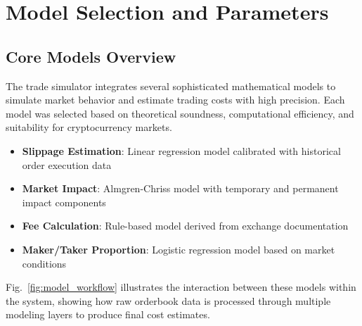 \documentclass[10pt,twocolumn,a4paper]{IEEEtran}
\begin{document}
\section{Model Selection and Parameters}

\subsection{Core Models Overview}

The trade simulator integrates several sophisticated mathematical models to simulate market behavior and estimate trading costs with high precision. Each model was selected based on theoretical soundness, computational efficiency, and suitability for cryptocurrency markets.

\begin{itemize}
    \item \textbf{Slippage Estimation}: Linear regression model calibrated with historical order execution data
    \item \textbf{Market Impact}: Almgren-Chriss model with temporary and permanent impact components
    \item \textbf{Fee Calculation}: Rule-based model derived from exchange documentation
    \item \textbf{Maker/Taker Proportion}: Logistic regression model based on market conditions
\end{itemize}

Fig.~\ref{fig:model_workflow} illustrates the interaction between these models within the system, showing how raw orderbook data is processed through multiple modeling layers to produce final cost estimates.
\end{document}

